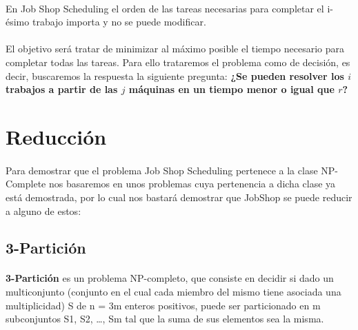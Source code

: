 \documentclass[11pt, a4paper,spanish]{article}
\begin{document}
			\paragraph{}
			En Job Shop Scheduling el orden de las tareas necesarias para completar el i-ésimo trabajo importa y no se puede modificar.
			 
			\paragraph{}
			El objetivo será tratar de minimizar al máximo posible el tiempo necesario para completar todas las tareas. Para ello trataremos el problema como de decisión, es decir, buscaremos la respuesta la siguiente pregunta:  
			\newline
			{ \bf ¿Se pueden resolver los $i$ trabajos a partir de las $j$ máquinas en un tiempo menor o igual que $r$?}
			
		\section{Reducción}
		
			\paragraph{}
			Para demostrar que el problema Job Shop Scheduling pertenece a la clase NP-Complete nos basaremos en unos problemas cuya pertenencia a dicha clase ya está demostrada, por lo cual nos bastará demostrar que JobShop se puede reducir a alguno de estos:
			
			
			\subsection{3-Partición}

				\paragraph{}
				{\bf 3-Partición} es un problema NP-completo, que consiste en decidir si dado un multiconjunto  (conjunto en el cual cada miembro del mismo tiene asociada una multiplicidad) S de n = 3m enteros positivos, puede ser particionado en m subconjuntos S1, S2, …, Sm tal que la suma de sus elementos sea la misma.
			
\end{document}
